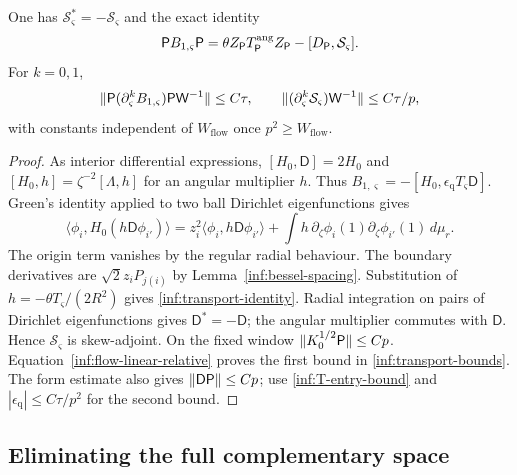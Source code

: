 \begin{lemma}\label{inf:transport}
One has $\mathcal S_\varsigma^*=-\mathcal S_\varsigma$ and the exact identity
\begin{equation}\label{inf:transport-identity}
 \mathsf P B_{1,\varsigma}\mathsf P=\theta Z_\mathsf P T_\mathsf P^{\mathrm{ang}} Z_\mathsf P
                             -[D_\mathsf P,\mathcal S_\varsigma].
\end{equation}
For $k=0,1$,
\begin{equation}\label{inf:transport-bounds}
 \lVert \mathsf P(\partial_\varsigma^kB_{1,\varsigma})\mathsf P\mathsf W^{-1}\rVert\le C\tau,
 \qquad
 \lVert (\partial_\varsigma^k\mathcal S_\varsigma)\mathsf W^{-1}\rVert\le C\tau/p,
\end{equation}
with constants independent of $W_{\mathrm{flow}}$ once
$p^2\ge W_{\mathrm{flow}}$.
\end{lemma}
\begin{proof}
As interior differential expressions,
$[H_0,\mathsf D]=2H_0$ and
$[H_0,h]=\zeta^{-2}[\Lambda,h]$ for an angular multiplier $h$.
Thus $B_{1,\varsigma}=-[H_0,\epsilon_{\mathrm q}T_\varsigma\mathsf D]$.
Green's identity applied to two ball Dirichlet eigenfunctions gives
\[
 \langle\phi_i,H_0(h\mathsf D\phi_{i'})\rangle
 =z_i^2\langle\phi_i,h\mathsf D\phi_{i'}\rangle
 +\int h\,\partial_\zeta\phi_i(1)
                 \partial_\zeta\phi_{i'}(1)\,d\mu_r.
\]
The origin term vanishes by the regular radial behaviour. The
boundary derivatives are $\sqrt2z_iP_{j(i)}$ by
Lemma~\ref{inf:bessel-spacing}. Substitution of
$h=-\theta T_\varsigma/(2R^2)$ gives
\eqref{inf:transport-identity}. Radial integration on pairs of
Dirichlet eigenfunctions gives $\mathsf D^*=-\mathsf D$; the
angular multiplier commutes with $\mathsf D$. Hence $\mathcal S_\varsigma$ is
skew-adjoint.
On the fixed window $\lVert K_0^{1/2}\mathsf P\rVert\le Cp$.
Equation~\eqref{inf:flow-linear-relative} proves the first bound
in \eqref{inf:transport-bounds}. The form estimate also gives
$\lVert \mathsf D\mathsf P\rVert\le Cp$; use
\eqref{inf:T-entry-bound} and
$|\epsilon_{\mathrm q}|\le C\tau/p^2$ for the second bound.
\end{proof}

\subsection{Eliminating the full complementary space}

